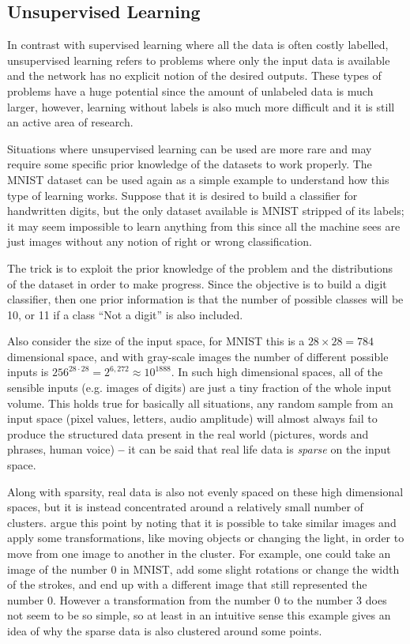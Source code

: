 \subsection{Unsupervised Learning} \label{sub:unsupervised_learning}
In contrast with supervised learning where all the data is often costly labelled, unsupervised learning refers to problems where only the input data is available and the network has no explicit notion of the desired outputs. These types of problems have a huge potential since the amount of unlabeled data is much larger, however, learning without labels is also much more difficult and it is still an active area of research.

Situations where unsupervised learning can be used are more rare and may require some specific prior knowledge of the datasets to work properly. The \gls{MNIST} dataset can be used again as a simple example to understand how this type of learning works. Suppose that it is desired to build a classifier for handwritten digits, but the only dataset available is \gls{MNIST} stripped of its labels; it may seem impossible to learn anything from this since all the machine sees are just images without any notion of right or wrong classification.

The trick is to exploit the prior knowledge of the problem and the distributions of the dataset in order to make progress. Since the objective is to build a digit classifier, then one prior information is that the number of possible classes will be 10, or 11 if a class ``Not a digit'' is also included.

Also consider the size of the input space, for \gls{MNIST} this is a $28{\times}28 = 784$ dimensional space, and with gray-scale images the number of different possible inputs is $256^{28\cdot28} = 2^{6,272} \approx 10^{1888}$. In such high dimensional spaces, all of the sensible inputs (e.g. images of digits) are just a tiny fraction of the whole input volume. This holds true for basically all situations, any random sample from an input space (pixel values, letters, audio amplitude) will almost always fail to produce the structured data present in the real world (pictures, words and phrases, human voice) \cite[chap. 5]{deepLearningBook2016} \textbf{--} it can be said that real life data is \textit{sparse} on the input space.

Along with sparsity, real data is also not evenly spaced on these high dimensional spaces, but it is instead concentrated around a relatively small number of clusters. \textcite[chap. 5]{deepLearningBook2016} argue this point by noting that it is possible to take similar images and apply some transformations, like moving objects or changing the light, in order to move from one image to another in the cluster. For example, one could take an image of the number 0 in \gls{MNIST}, add some slight rotations or change the width of the strokes, and end up with a different image that still represented the number 0. However a transformation from the number 0 to the number 3 does not seem to be so simple, so at least in an intuitive sense this example gives an idea of why the sparse data is also clustered around some points.

